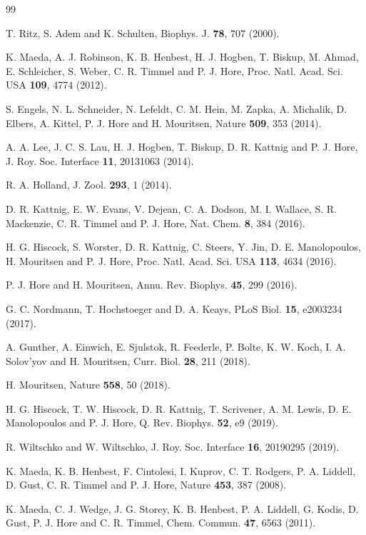 \documentclass[%
aip,
jcp,%
amsmath,amssymb,
reprint%
]{revtex4-1}
\begin{document}
\begin{thebibliography}{99}

T. Ritz, S. Adem and K. Schulten, Biophys. J. {\bf 78}, 707 (2000).

K. Maeda, A. J. Robinson, K. B. Henbest, H. J. Hogben, T. Biskup, M. Ahmad, E. Schleicher, S. Weber, C. R. Timmel and P. J. Hore, Proc. Natl. Acad. Sci. USA {\bf 109}, 4774 (2012).

S. Engels, N. L. Schneider, N. Lefeldt, C. M. Hein, M. Zapka, A. Michalik, D. Elbers, A. Kittel, P. J. Hore and H. Mouritsen, Nature {\bf 509}, 353 (2014).

A. A. Lee, J. C. S. Lau, H. J. Hogben, T. Biskup, D. R. Kattnig and P. J. Hore, J. Roy. Soc. Interface {\bf 11}, 20131063 (2014).

R. A. Holland, J. Zool. {\bf 293}, 1 (2014).

D. R. Kattnig, E. W. Evans, V. Dejean, C. A. Dodson, M. I. Wallace, S. R. Mackenzie, C. R. Timmel and P. J. Hore, Nat. Chem. {\bf 8}, 384 (2016).

H. G. Hiscock, S. Worster, D. R. Kattnig, C. Steers, Y. Jin, D. E. Manolopoulos, H. Mouritsen and P. J. Hore, Proc. Natl. Acad. Sci. USA {\bf 113}, 4634 (2016).

P. J. Hore and H. Mouritsen, Annu. Rev. Biophys. {\bf 45}, 299 (2016).

G. C. Nordmann, T. Hochstoeger and D. A. Keays, PLoS Biol. {\bf 15}, e2003234 (2017).

A. Gunther, A. Einwich, E. Sjulstok, R. Feederle, P. Bolte, K. W. Koch, I. A. Solov'yov and H. Mouritsen, Curr. Biol. {\bf 28}, 211 (2018).

H. Mouritsen, Nature {\bf 558}, 50 (2018).

H. G. Hiscock, T. W. Hiscock, D. R. Kattnig, T. Scrivener, A. M. Lewis, D. E. Manolopoulos and P. J. Hore, Q. Rev. Biophys. {\bf 52}, e9 (2019). 

R. Wiltschko and W. Wiltschko, J. Roy. Soc. Interface {\bf 16}, 20190295 (2019).

K. Maeda, K. B. Henbest, F. Cintolesi, I. Kuprov, C. T. Rodgers, P. A. Liddell, D. Gust, C. R. Timmel and P. J. Hore, Nature {\bf 453}, 387 (2008).

K. Maeda, C. J. Wedge, J. G. Storey, K. B. Henbest, P. A. Liddell, G. Kodis, D. Gust, P. J. Hore and C. R. Timmel, Chem. Commun. {\bf 47}, 6563 (2011).


\end{thebibliography}
\end{document}
